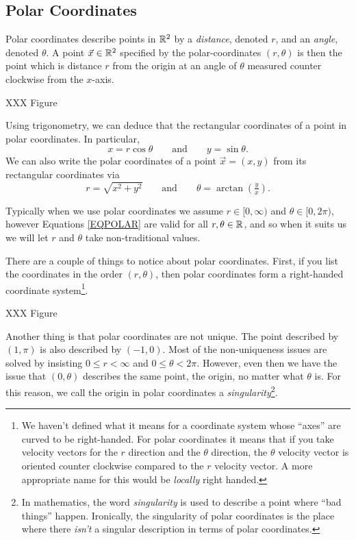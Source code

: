 \subsection{Polar Coordinates}
Polar coordinates describe points in $\mathbb{R}^2$ by a \emph{distance}, denoted $r$,
and an \emph{angle}, denoted $\theta$.  A point $\vec x\in\mathbb{R}^2$ specified by the polar-coordinates
$(r,\theta)$ is then the point which is distance $r$ from the origin at an angle of $\theta$
measured counter clockwise from the $x$-axis.

XXX Figure

Using trigonometry, we can deduce that the rectangular coordinates of a point in polar coordinates.
In particular,
\begin{equation}
	\label{EQPOLAR}
	x=r\cos\theta\qquad\text{and}\qquad y=\sin\theta.
\end{equation}
We can also write the polar coordinates of a point $\vec x=(x,y)$ from its rectangular coordinates via
\[
	r=\sqrt{x^2+y^2}\qquad\text{and}\qquad \theta=\arctan\left( \tfrac{y}{x}\right).
\]

Typically when we use polar coordinates we assume $r\in[0,\infty)$ and $\theta\in[0,2\pi)$, however
Equations \eqref{EQPOLAR} are valid for all $r,\theta\in\mathbb{R}$, and so when it suits us we will let
$r$ and $\theta$ take non-traditional values.

There are a couple of things to notice about polar coordinates.  First, if you list
the coordinates in the order $(r,\theta)$, then polar coordinates form a right-handed
coordinate system\footnote{ We haven't defined what it means for a coordinate system
whose ``axes'' are curved to be right-handed.  For polar coordinates it means that if
you take velocity vectors for the $r$ direction and the $\theta$ direction, the $\theta$
velocity vector is oriented counter clockwise compared to the $r$ velocity vector.  A more
appropriate name for this would be \emph{locally} right handed.}. 

XXX Figure

Another thing is that polar coordinates are not unique.  The point described by $(1,\pi)$
is also described by $(-1,0)$.  Most of the non-uniqueness issues are solved by insisting
$0\leq r <\infty$ and $0\leq\theta < 2\pi$.  However, even then we have the issue that
$(0,\theta)$ describes the same point, the origin, no matter what $\theta$ is.  For this reason,
we call the origin in polar coordinates a \emph{singularity}\footnote{ In mathematics, the word
\emph{singularity} is used to describe a point where ``bad things'' happen.  Ironically, the
singularity of polar coordinates is the place where there \emph{isn't} a singular description
in terms of polar coordinates.}.


